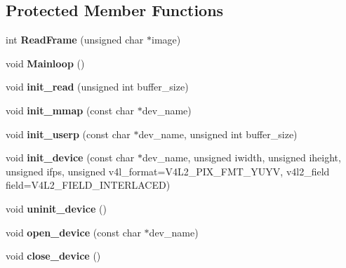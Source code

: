 \subsection*{Protected Member Functions}
\begin{DoxyCompactItemize}
\item 
int {\bfseries Read\+Frame} (unsigned char $\ast$image)\hypertarget{classpangolin_1_1_v4l_video_aa03b102d989b5015a84ee3e8930fded8}{}\label{classpangolin_1_1_v4l_video_aa03b102d989b5015a84ee3e8930fded8}

\item 
void {\bfseries Mainloop} ()\hypertarget{classpangolin_1_1_v4l_video_a53a08ab6f9b341600b779ef2213e0a6b}{}\label{classpangolin_1_1_v4l_video_a53a08ab6f9b341600b779ef2213e0a6b}

\item 
void {\bfseries init\+\_\+read} (unsigned int buffer\+\_\+size)\hypertarget{classpangolin_1_1_v4l_video_a71e92f409fa13567a937a5e0e77900bf}{}\label{classpangolin_1_1_v4l_video_a71e92f409fa13567a937a5e0e77900bf}

\item 
void {\bfseries init\+\_\+mmap} (const char $\ast$dev\+\_\+name)\hypertarget{classpangolin_1_1_v4l_video_af6c3c40044ee09e50e22fe9cfa728efd}{}\label{classpangolin_1_1_v4l_video_af6c3c40044ee09e50e22fe9cfa728efd}

\item 
void {\bfseries init\+\_\+userp} (const char $\ast$dev\+\_\+name, unsigned int buffer\+\_\+size)\hypertarget{classpangolin_1_1_v4l_video_a2539b07bc8d2fde5a1a9aa07cc85d180}{}\label{classpangolin_1_1_v4l_video_a2539b07bc8d2fde5a1a9aa07cc85d180}

\item 
void {\bfseries init\+\_\+device} (const char $\ast$dev\+\_\+name, unsigned iwidth, unsigned iheight, unsigned ifps, unsigned v4l\+\_\+format=V4\+L2\+\_\+\+P\+I\+X\+\_\+\+F\+M\+T\+\_\+\+Y\+U\+YV, v4l2\+\_\+field field=V4\+L2\+\_\+\+F\+I\+E\+L\+D\+\_\+\+I\+N\+T\+E\+R\+L\+A\+C\+ED)\hypertarget{classpangolin_1_1_v4l_video_a92835b5adcb2c00902be4f4556a0a9a6}{}\label{classpangolin_1_1_v4l_video_a92835b5adcb2c00902be4f4556a0a9a6}

\item 
void {\bfseries uninit\+\_\+device} ()\hypertarget{classpangolin_1_1_v4l_video_a6bb2b253d94bb0e6e6af51c452df4df3}{}\label{classpangolin_1_1_v4l_video_a6bb2b253d94bb0e6e6af51c452df4df3}

\item 
void {\bfseries open\+\_\+device} (const char $\ast$dev\+\_\+name)\hypertarget{classpangolin_1_1_v4l_video_a40328a5e2bbe793fcf81445b7b2dc668}{}\label{classpangolin_1_1_v4l_video_a40328a5e2bbe793fcf81445b7b2dc668}

\item 
void {\bfseries close\+\_\+device} ()\hypertarget{classpangolin_1_1_v4l_video_a6e8663c9e310c200f93130a80993409c}{}\label{classpangolin_1_1_v4l_video_a6e8663c9e310c200f93130a80993409c}

\end{DoxyCompactItemize}
